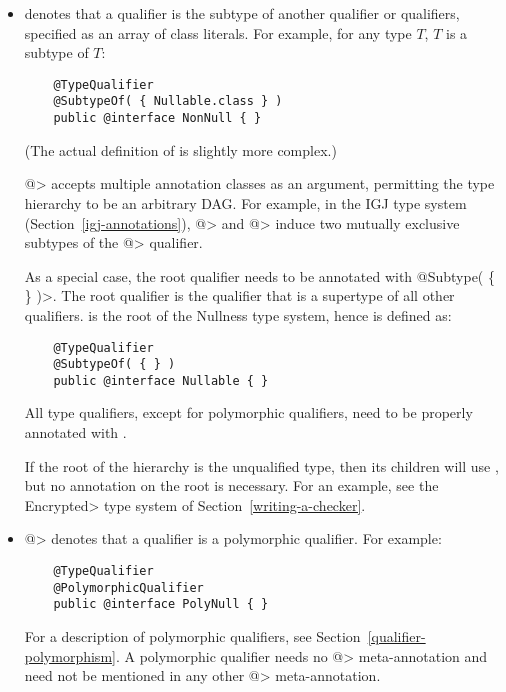 \begin{itemize}

\item {} denotes that a qualifier is the subtype of
  another qualifier or qualifiers, specified as an array of class
  literals.  For example, for any type $T$,
   $T$ is a subtype of  $T$:

  \begin{Verbatim}
    @TypeQualifier
    @SubtypeOf( { Nullable.class } )
    public @interface NonNull { }
  \end{Verbatim}

  (The actual definition of  is slightly more complex.)


  \<@> accepts multiple annotation classes as an argument,
  permitting the type hierarchy to be an arbitrary DAG\@.  For example,
  in the IGJ type system (Section~\ref{igj-annotations}), \<@>
  and \<@> induce two mutually exclusive subtypes of the
  \<@> qualifier.

  As a special case, the root qualifier needs to be annotated with
  \<@Subtype( \{ \} )>.  The root qualifier is the qualifier that is
  a supertype of all other qualifiers.  
  is the root of the Nullness type system, hence is defined as:

  \begin{Verbatim}
    @TypeQualifier
    @SubtypeOf( { } )
    public @interface Nullable { }
  \end{Verbatim}

  All type qualifiers, except for polymorphic qualifiers, need to be
  properly annotated with .

  If the root of the hierarchy is the unqualified type, then its children
  will use , but no  annotation on the root is necessary.  For an example, see the
  \<Encrypted> type system of Section~\ref{writing-a-checker}.

\item \<@> denotes that a qualifier is a
  polymorphic qualifier.  For example:

  \begin{Verbatim}
    @TypeQualifier
    @PolymorphicQualifier
    public @interface PolyNull { }
  \end{Verbatim}

  For a description of polymorphic qualifiers, see
  Section~\ref{qualifier-polymorphism}.  A polymorphic qualifier needs
  no \<@> meta-annotation and need not be
  mentioned in any other \<@>
  meta-annotation.

\end{itemize}

